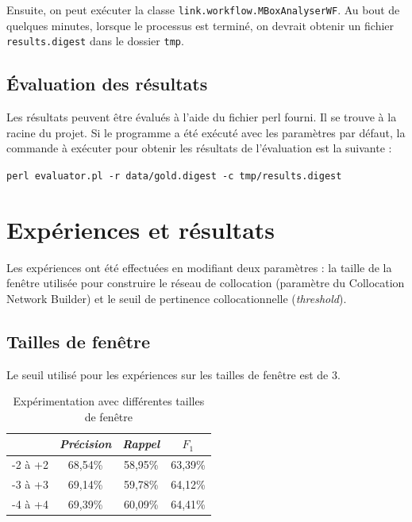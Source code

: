 \documentclass[a4paper]{article}
\begin{document}
Ensuite, on peut exécuter la classe \texttt{link.workflow.MBoxAnalyserWF}. Au bout de quelques minutes, lorsque le processus est terminé, on devrait obtenir un fichier \texttt{results.digest} dans le dossier \texttt{tmp}.

\subsection{Évaluation des résultats}

Les résultats peuvent être évalués à l'aide du fichier perl fourni. Il se trouve à la racine du projet. Si le programme a été exécuté avec les paramètres par défaut, la commande à exécuter pour obtenir les résultats de l'évaluation est la suivante :\newline

\texttt{perl evaluator.pl -r data/gold.digest -c tmp/results.digest}

\section{Expériences et résultats}

Les expériences ont été effectuées en modifiant deux paramètres : la taille de la fenêtre utilisée pour construire le réseau de collocation (paramètre du Collocation Network Builder) et le seuil de pertinence collocationnelle (\textit{threshold}).

\subsection{Tailles de fenêtre}

Le seuil utilisé pour les expériences sur les tailles de fenêtre est de 3.

\FloatBarrier

\begin{table}[h]
	\centering
	\begin{tabular}{l|c|c|c|}
	\cline{2-4}
		                   & \textit{Précision} & \textit{Rappel} & \textit{$F_1$} \\ \hline
	\multicolumn{1}{|l|}{-2 à +2} & 68,54\% & 58,95\% & 63,39\% \\ \hline
	\multicolumn{1}{|l|}{-3 à +3} & 69,14\% & 59,78\% & 64,12\% \\ \hline
	\multicolumn{1}{|l|}{-4 à +4} & 69,39\% & 60,09\% & 64,41\% \\ \hline
	\end{tabular}
	\caption{Expérimentation avec différentes tailles de fenêtre}
\end{table}
\end{document}
